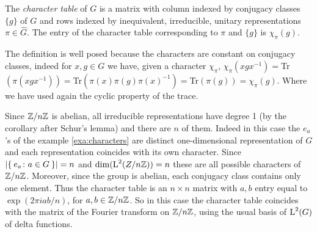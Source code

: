 \begin{defn}
The \emph{character table} of $G$ is a matrix with column indexed by conjugacy classes $\{g\}$ of $G$ and rows indexed by inequivalent, irreducible, unitary representations $\pi \in \hat{G}$. The entry of   the character table corresponding to $\pi$ and $\{g\}$ is $\chi_\pi(g)$.
\end{defn}
\begin{rem}
The definition is well posed because the characters are constant on conjugacy classes, indeed for $x,g\in G$ we have, given a character $\chi_\pi$, $\chi_\pi(xgx^{-1})=$Tr$(\pi(xgx^{-1}))=$Tr$(\pi(x)\pi(g)\pi(x)^{-1})=$Tr$(\pi(g))=\chi_\pi(g)$.
Where we have used again the cyclic property of the trace.
\end{rem}
\begin{exmp}[$\Z/{n\Z}$]
Since $\Z/{n\Z}$ is abelian, all irreducible representations  have  degree  1 (by the corollary after Schur's lemma)  and  there  are $n$ of them. Indeed in this case  the $e_a$'s of the example \ref{exa:characters}  are  distinct one-dimensional representation of $G$ and each representation coincides with its own character. Since $\lvert\Set{e_a\colon a \in G}\rvert= n $ and $\dim(\operatorname{L}^{2}(Z/{n{\mathbb Z}}))=n$ these are all possible characters of $\Z/{n\Z}$. Moreover, since the group is abelian, each conjugacy class contains only one element. Thus the character table is an $n\times n$ matrix with $a,b$ entry equal to  $\exp(2\pi iab/n)$, for $a,b \in {\mathbb Z}/{n{\mathbb Z}}$. So in this case the character table coincides with the matrix of the Fourier transform on  $\Z/{n\Z}$, using the usual basis of $\operatorname{L}^{2}(G)$ of delta functions.	
\end{exmp}

